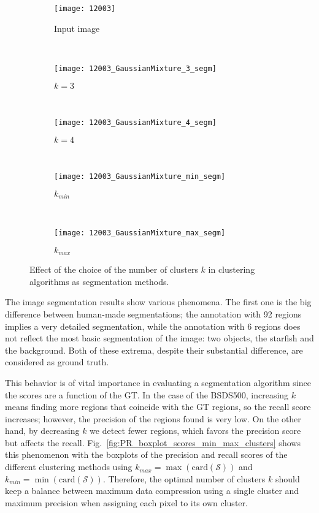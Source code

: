 \begin{figure}[!ht]
    
    \begin{subfigure}[b]{0.23\textwidth}
        \texttt{[image: 12003]}
        \caption{Input image}
    \end{subfigure} \\  \vspace{5pt}
    
    \begin{subfigure}[b]{0.23\textwidth}
    	\centering
    	\texttt{[image: 12003\_GaussianMixture\_3\_segm]}
        \caption{$k=3$ }
    \end{subfigure} ~
    \begin{subfigure}[b]{0.23\textwidth}
    	\centering
        \texttt{[image: 12003\_GaussianMixture\_4\_segm]}
        \caption{$k=4$}
    \end{subfigure} ~
    \begin{subfigure}[b]{0.23\textwidth}
    	\centering
    	\texttt{[image: 12003\_GaussianMixture\_min\_segm]}
        \caption{$k_{min}$}
    \end{subfigure} ~
    \begin{subfigure}[b]{0.23\textwidth}
    	\centering
    	\texttt{[image: 12003\_GaussianMixture\_max\_segm]}
        \caption{$k_{max}$}
    \end{subfigure} 
        	    
    \caption{Effect of the choice of the number of clusters $k$ in clustering algorithms as segmentation methods.}\label{fig:Gmixture_starfish_segms_diff_k}    
\end{figure}

The image segmentation results show various phenomena. The first one is the big difference between human-made segmentations; the annotation with 92 regions implies a very detailed segmentation, while the annotation with 6 regions does not reflect the most basic segmentation of the image: two objects, the starfish and the background. Both of these extrema, despite their substantial difference, are considered as ground truth.

This behavior is of vital importance in evaluating a segmentation algorithm since the scores are a function of the GT. In the case of the BSDS500, increasing $k$ means finding more regions that coincide with the GT regions, so the recall score increases; however, the precision of the regions found is very low. On the other hand, by decreasing $k$ we detect fewer regions, which favors the precision score but affects the recall. Fig.\ \ref{fig:PR_boxplot_scores_min_max_clusters} shows this phenomenon with the boxplots of the precision and recall scores of the different clustering methods using $k_{max}=\max\left(\mathrm{card}(\mathcal{S})\right)$ and $k_{min}=\min\left(\mathrm{card}(\mathcal{S})\right)$. Therefore, the optimal number of clusters $k$ should keep a balance between maximum data compression using a single cluster and maximum precision when assigning each pixel to its own cluster.


